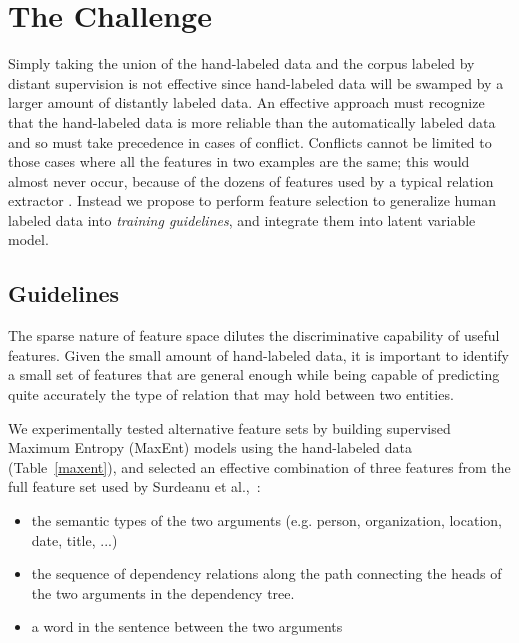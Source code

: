 \documentclass[11pt]{article}
\begin{document}
\section{The Challenge}

Simply taking the union of the hand-labeled data and the corpus labeled by distant supervision is not effective since hand-labeled
data will be swamped by a larger amount of distantly labeled data. An effective approach must recognize that the hand-labeled data
is more reliable than the automatically labeled data and so must take precedence
in cases of conflict. Conflicts cannot be limited to those cases where all the
features in two examples are the same; this would almost never occur, because of the dozens of features used by a typical relation
extractor \cite{zhou05}.
Instead we propose to perform feature selection to generalize human labeled data into \textit{training guidelines}, and integrate them into latent variable model.

 \subsection{Guidelines}
 \label{guidel}
 
The sparse nature of feature space dilutes the discriminative capability of useful features.
Given the small amount of hand-labeled data, it is important to
identify a small set of features that are general enough while being capable of
predicting quite accurately the type of relation that may hold
between two entities. 

We experimentally tested alternative feature sets by building
supervised Maximum Entropy (MaxEnt) models using the hand-labeled data (Table~\ref{maxent}), and selected
an effective combination of three features from the full feature set used by Surdeanu et al.,~: \vspace{-1mm}
\begin{itemize}[leftmargin=*]\itemsep -0.3em
\item the semantic types of the two arguments (e.g. person, organization, location, date, title, ...)
 \item the sequence of dependency relations along the path
 connecting the heads of the two arguments in the dependency tree.
 \item a word in the sentence between the two arguments
\end{itemize}

\end{document}
